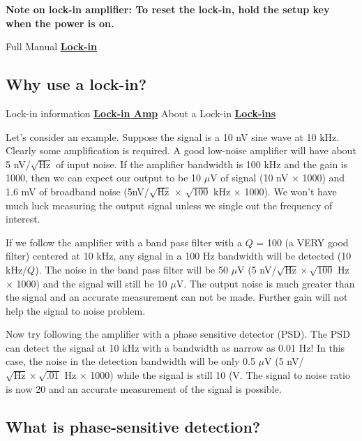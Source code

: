 \documentclass{../lab}
\begin{document}
\textbf{Note on lock-in amplifier: To reset the lock-in, hold the setup key when the power is on.}

Full Manual \href{http://physics111.lib.berkeley.edu/Physics111/Equipment\_Manuals/SRS/SR830m.pdf}{\textbf{Lock-in}}

\subsection{Why use a lock-in?}

Lock-in information \href{http://physics111.lib.berkeley.edu/Physics111/Reprints/NMR/Lock-in-Amp.pdf}{\textbf{Lock-in Amp}} About a Lock-in \href{http://physics111.lib.berkeley.edu/Physics111/Reprints/NMR/About-Lock-Ins.pdf}{\textbf{Lock-ins}}

Let's consider an example. Suppose the signal is a 10 nV sine wave at 10 kHz. Clearly some amplification is required. A good low-noise amplifier will have about 5 nV/$\sqrt{\text{Hz}}$ of input noise. If the amplifier bandwidth is 100 kHz and the gain is 1000, then we can expect our output to be 10 $\mu$V of signal (10 nV $\times$ 1000) and 1.6 mV of broadband noise (5nV/$\sqrt{\text{Hz}}$ $\times$ $\sqrt{100}$ kHz $\times$ 1000). We won't have much luck measuring the output signal unless we single out the frequency of interest.

\newpage

If we follow the amplifier with a band pass filter with a $Q$ = 100 (a VERY good filter) centered at 10 kHz, any signal in a 100 Hz bandwidth will be detected (10 kHz/$Q$). The noise in the band pass filter will be 50 $\mu$V (5 nV/$\sqrt{\text{Hz}} \times \sqrt{100}$ Hz $\times$ 1000) and the signal will still be 10 $\mu$V. The output noise is much greater than the signal and an accurate measurement can not be made. Further gain will not help the signal to noise problem.

Now try following the amplifier with a phase sensitive detector (PSD). The PSD can detect the signal at 10 kHz with a bandwidth as narrow as 0.01 Hz! In this case, the noise in the detection bandwidth will be only 0.5 $\mu$V (5 nV/$\sqrt{\text{Hz}} \times \sqrt{.01}$ Hz $\times$ 1000) while the signal is still 10 (V. The signal to noise ratio is now 20 and an accurate measurement of the signal is possible.

\subsection{What is phase-sensitive detection?}
\end{document}

